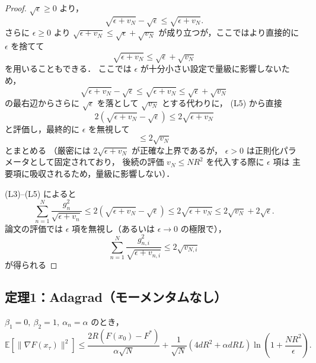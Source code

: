 \documentclass[dvipdfmx,a4paper,11pt]{jsarticle}
\begin{document}
\begin{proof}
\medskip
\noindent
$\sqrt{\epsilon} \geq 0$ より，
\[
    \sqrt{\epsilon + v_N} - \sqrt{\epsilon} \leq \sqrt{\epsilon + v_N}.
    \tag{L5}
\]
さらに $\epsilon \geq 0$ より $\sqrt{\epsilon + v_N} \leq \sqrt{\epsilon} + \sqrt{v_N}$
が成り立つが，ここではより直接的に $\epsilon$ を捨てて
\[
    \sqrt{\epsilon + v_N} \leq \sqrt{\epsilon} + \sqrt{v_N}
\]
を用いることもできる．
ここでは $\epsilon$ が十分小さい設定で量級に影響しないため，
\[
    \sqrt{\epsilon + v_N} - \sqrt{\epsilon}
    \leq \sqrt{\epsilon + v_N}
    \leq \sqrt{\epsilon} + \sqrt{v_N}
\]
の最右辺からさらに $\sqrt{\epsilon}$ を落として $\sqrt{v_N}$ とする代わりに，
(L5) から直接
\[
    2\!\left(\sqrt{\epsilon + v_N} - \sqrt{\epsilon}\right)
    \leq 2\sqrt{\epsilon + v_N}
\]
と評価し，最終的に $\epsilon$ を無視して
\[
    \leq 2\sqrt{v_N}
\]
とまとめる
（厳密には $2\sqrt{\epsilon + v_N}$ が正確な上界であるが，
$\epsilon > 0$ は正則化パラメータとして固定されており，
後続の評価 $v_{N} \leq NR^2$ を代入する際に $\epsilon$ 項は
主要項に吸収されるため，量級に影響しない）．

\medskip
\noindent
(L3)–(L5) によると
\[
    \sum_{n=1}^N \frac{g_n^2}{\sqrt{\epsilon + v_n}}
    \leq 2\!\left(\sqrt{\epsilon + v_N} - \sqrt{\epsilon}\right)
    \leq 2\sqrt{\epsilon + v_N}
    \leq 2\sqrt{v_N} + 2\sqrt{\epsilon}.
\]
論文の評価では $\epsilon$ 項を無視し（あるいは $\epsilon \to 0$ の極限で），
\[
    \displaystyle\sum_{n=1}^N \frac{g_{n,i}^2}{\sqrt{\epsilon + v_{n,i}}}
    \leq 2\sqrt{v_{N,i}}
\]
が得られる
\end{proof}


\bigskip
\subsection{定理1：Adagrad（モーメンタムなし）}

\begin{thm}
$\beta_1=0,\ \beta_2=1,\ \alpha_n=\alpha$ のとき，
\begin{equation}
    \mathbb{E}[\|\nabla F(x_\tau)\|^2]
    \leq
    \frac{2R(F(x_0)-F^*)}{\alpha\sqrt{N}}
    + \frac{1}{\sqrt{N}}(4dR^2 + \alpha dRL)\ln\!\left(1+\frac{NR^2}{\epsilon}\right).
\end{equation}
\end{thm}
\end{document}

